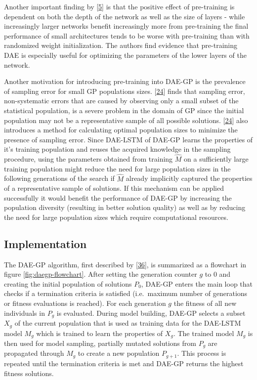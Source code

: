 \documentclass[
  11pt,
]{article}
\begin{document}
Another important finding by {[}\protect\hyperlink{ref-pmlr-v5-erhan09a}{5}{]} is that the positive effect of pre-training is dependent on both the depth of the network as well as the size of layers - while increasingly larger networks benefit increasingly more from pre-training the final performance of small architectures tends to be worse with pre-training than with randomized weight initialization.
The authors find evidence that pre-training DAE is especially useful for optimizing the parameters of the lower layers of the network.

Another motivation for introducing pre-training into DAE-GP is the prevalence of sampling error for small GP populations sizes.
{[}\protect\hyperlink{ref-sampling_err_gp}{24}{]} finds that sampling error, non-systematic errors that are caused by observing only a small subset of the statistical population, is a severe problem in the domain of GP since the initial population may not be a representative sample of all possible solutions.
{[}\protect\hyperlink{ref-sampling_err_gp}{24}{]} also introduces a method for calculating optimal population sizes to minimize the presence of sampling error.
Since DAE-LSTM of DAE-GP learns the properties of it's training population and reuses the acquired knowledge in the sampling procedure, using the parameters obtained from training \(\hat{M}\) on a sufficiently large training population might reduce the need for large population sizes in the following generations of the search if \(\hat{M}\) already implicitly captured the properties of a representative sample of solutions.
If this mechanism can be applied successfully it would benefit the performance of DAE-GP by increasing the population diversity (resulting in better solution quality) as well as by reducing the need for large population sizes which require computational resources.

\hypertarget{implementation}{%
\subsection{Implementation}\label{implementation}}

The DAE-GP algorithm, first described by {[}\protect\hyperlink{ref-dae-gp_2020_rtree}{36}{]}, is summarized as a flowchart in figure \ref{fig:daegp-flowchart}.
After setting the generation counter \(g\) to \(0\) and creating the initial population of solutions \(P_0\), DAE-GP enters the main loop that checks if a termination criteria is satisfied (i.e.~maximum number of generations or fitness evaluations is reached).
For each generation \(g\) the fitness of all new individuals in \(P_g\) is evaluated.
During model building, DAE-GP selects a subset \(X_g\) of the current population that is used as training data for the DAE-LSTM model \(M_g\) which is trained to learn the properties of \(X_g\).
The trained model \(M_g\) is then used for model sampling, partially mutated solutions from \(P_g\) are propagated through \(M_g\) to create a new population \(P_{g+1}\).
This process is repeated until the termination criteria is met and DAE-GP returns the highest fitness solutions.
\end{document}
